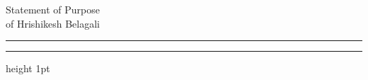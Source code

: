 \documentclass{article}
\newcommand{\soptitle}{Statement of Purpose}
\newcommand{\yourname}{Hrishikesh Belagali}
\newcommand{\statement}[1]{\par\medskip
  \underline{\textcolor{blue}{\textbf{#1:}}}\space
}
\begin{document}
\begin{center}\LARGE\soptitle\\
\large of \yourname\
\end{center}

\hrule
\vspace{1pt}
\hrule height 1pt

\bigskip
\end{document}
